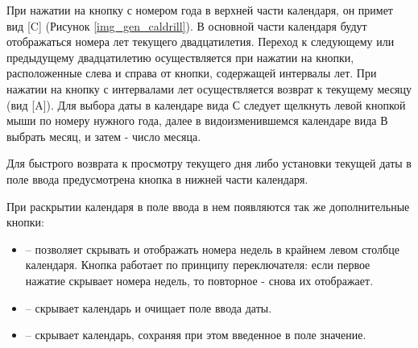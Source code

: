 При нажатии на кнопку с номером года в верхней части календаря, он примет вид [C] (Рисунок \ref{img_gen_caldrill}). В основной части календаря будут отображаться номера лет текущего двадцатилетия. Переход к следующему или предыдущему двадцатилетию осуществляется при нажатии на кнопки, расположенные слева и справа от кнопки, содержащей интервалы лет. При нажатии на кнопку с интервалами лет осуществляется возврат к текущему месяцу (вид [A]). Для выбора даты в календаре вида С следует щелкнуть левой кнопкой мыши по номеру нужного года, далее в видоизменившемся календаре вида В выбрать месяц, и затем - число месяца.
 
Для быстрого возврата к просмотру текущего дня либо установки текущей даты в поле ввода предусмотрена кнопка  в нижней части календаря. 

При раскрытии календаря в поле ввода в нем появляются так же дополнительные кнопки:

\begin{itemize}
	\item {} -- позволяет скрывать и отображать номера недель в крайнем левом столбце календаря. Кнопка работает по принципу переключателя: если первое нажатие скрывает номера недель, то повторное - снова их отображает.
	\item {} -- скрывает календарь и очищает поле ввода даты.
	\item {} -- скрывает календарь, сохраняя при этом введенное в поле значение. 
\end{itemize}